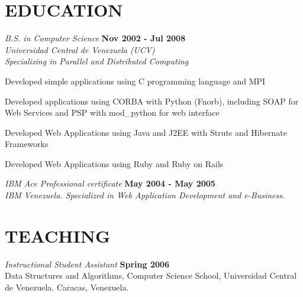 \documentclass[line,margin]{res}
\begin{document}
\begin{resume}
\section{EDUCATION}
  {\sl B.S. in Computer Science} \hfill \textbf{Nov 2002 - Jul 2008} \\
  {\sl Universidad Central de Venezuela (UCV) } \\
  {\sl Specializing in Parallel and Distributed Computing} \\
  \begin{list}{}{\leftmargin=1em}
    \item Developed simple applications using C programming language and MPI
    \item Developed applications using CORBA with Python (Fnorb), including SOAP for Web Services 
          and PSP with mod\_python for web interface
    \item Developed Web Applications using Java and J2EE with Struts and Hibernate Frameworks
    \item Developed Web Applications using Ruby and Ruby on Rails
  \end{list}
  {\sl IBM Ace Professional certificate} \hfill \textbf{May 2004 - May 2005} \\
  {\sl IBM Venezuela. Specialized in Web Application Development and e-Business.}
  
\section{TEACHING}
  {\sl Instructional Student Assistant} \hfill \textbf{Spring 2006} \\
  \newline
  Data Structures and Algorithms, Computer Science School, Universidad Central de Venezuela. Caracas, Venezuela.


\end{resume}
\end{document}
